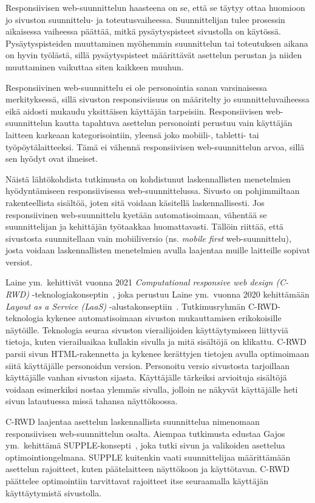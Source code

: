 \documentclass[finnish, 12pt, a4paper, elec, utf8, a-1b]{aaltothesis}
\begin{document}
Responsiivisen web-suunnittelun haasteena on se, että se täytyy ottaa huomioon
jo sivuston suunnittelu- ja toteutusvaiheessa. Suunnittelijan tulee prosessin
aikaisessa vaiheessa päättää, mitkä pysäytyspisteet sivustolla on käytössä.
Pysäytyspisteiden muuttaminen myöhemmin suunnittelun tai toteutuksen aikana on
hyvin työlästä, sillä pysäytyspisteet määrittävät asettelun perustan ja niiden
muuttaminen vaikuttaa siten kaikkeen muuhun.

Responsiivinen web-suunnittelu ei ole personointia sanan varsinaisessa
merkityksessä, sillä sivuston responsiviisuus on määritelty jo
suunnitteluvaiheessa eikä aidosti mukaudu yksittäisen käyttäjän tarpeisiin.
Responsiivisen web-suunnittelun kautta tapahtuva asettelun personointi perustuu
vain käyttäjän laitteen karkeaan kategorisointiin, yleensä joko mobiili-,
tabletti- tai työpöytälaitteeksi. Tämä ei vähennä responsiivisen
web-suunnittelun arvoa, sillä sen hyödyt ovat ilmeiset.

Näistä lähtökohdista tutkimusta on kohdistunut laskennallisten menetelmien
hyödyntämiseen responsiivisessa web-suunnittelussa. Sivusto on pohjimmiltaan
rakenteellista sisältöä, joten sitä voidaan käsitellä laskennallisesti. Jos
responsiivinen web-suunnittelu kyetään automatisoimaan, vähentää se
suunnittelijan ja kehittäjän työtaakkaa huomattavasti. Tällöin riittää, että
sivustosta suunnitellaan vain mobiiliversio (ns. \textit{mobile first}
web-suunnittelu), josta voidaan laskennallisten menetelmien avulla laajentaa
muille laitteille sopivat versiot.

Laine ym.~kehittivät vuonna 2021 \textit{Computational responsive web design
(C-RWD)} -teknologiakonseptin~\cite{laine2021responsive}, joka perustuu Laine
ym.~vuonna 2020 kehittämään \textit{Layout as a Service (LaaS)}
-alustakonseptiin~\cite{laine2020_laas}. Tutkimusryhmän C-RWD-teknologia
kykenee automatisoimaan sivuston mukauttamisen erikokoisille näytöille.
Teknologia seuraa sivuston vierailijoiden käyttäytymiseen liittyviä tietoja,
kuten vierailuaikaa kullakin sivulla ja mitä sisältöjä on klikattu. C-RWD parsii
sivun HTML-rakennetta ja kykenee kerättyjen tietojen avulla optimoimaan siitä
käyttäjälle personoidun version. Personoitu versio sivustosta tarjoillaan
käyttäjälle vanhan sivuston sijasta. Käyttäjälle tärkeiksi arvioituja sisältöjä
voidaan esimerkiksi nostaa ylemmäs sivulla, jolloin ne näkyvät käyttäjälle heti
sivun latautuessa missä tahansa näyttökoossa.

C-RWD laajentaa asettelun laskennallista suunnittelua nimenomaan responsiivisen
web-suunnittelun osalta. Aiempaa tutkimusta edustaa Gajos ym.~kehittämä
SUPPLE-konsepti~\cite{10.1145/964442.964461}, joka tutki sivun ja valikoiden
asettelua optimointiongelmana. SUPPLE kuitenkin vaati suunnittelijaa
määrittämään asettelun rajoitteet, kuten päätelaitteen näyttökoon ja
käyttötavan. C-RWD päättelee optimointiin tarvittavat rajoitteet itse
seuraamalla käyttäjän käyttäytymistä sivustolla.
\end{document}
